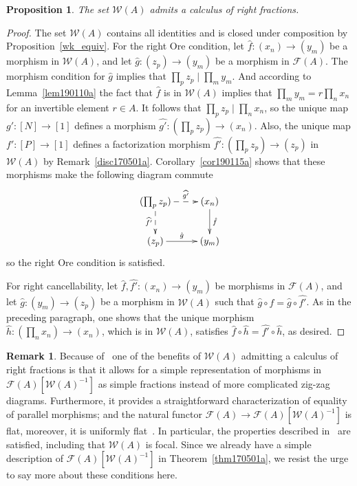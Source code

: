 \documentclass[reqno]{amsart}
\theoremstyle{plain}
\newtheorem{prop}[lem]{Proposition}
\theoremstyle{definition}
\newtheorem{disc}[lem]{Remark}
\newcommand{\cat}[1]{\mathcal{#1}}
\newcommand{\catw}{\cat{W}}
\newcommand{\catf}{\cat{F}}
\numberwithin{equation}{lem}
\begin{document}
\begin{prop} \label{prop190106a}
The set $\catw(A)$ admits a calculus of right fractions.
\end{prop}

\begin{proof}
The set $\catw(A)$ contains all identities and is closed under composition by Proposition~\ref{wk_equiv}.
For the right Ore condition, let $\hat f\colon(x_n)\to(y_m)$ be a morphism in $\catw(A)$, and let
$\hat g\colon(z_p)\to(y_m)$ be a morphism in $\catf(A)$. 
The morphism condition for $\hat g$ implies that $\prod_pz_p\mid\prod_my_m$.
And according to Lemma~\ref{lem190110a}
the fact that $\hat f$ is in $\catw(A)$ implies that $\prod_my_m=r\prod_nx_n$ for an invertible element $r\in A$.
It follows that $\prod_pz_p\mid\prod_nx_n$, so the unique map $g'\colon[N]\to[1]$ defines a morphism $\widehat{g'}\colon(\prod_pz_p)\to(x_n)$.
Also, the unique map $f'\colon [P]\to[1]$ defines a factorization morphism $\widehat{f'}\colon(\prod_pz_p)\to(z_p)$ in $\catw(A)$
by Remark~\ref{disc170501a}.
Corollary~\ref{cor190115a} shows that these morphisms
make the following diagram commute
$$\xymatrix{
(\prod_pz_p) \ar@{-->}[r]^-{\widehat{g'}}\ar@{-->}[d]_{\widehat{f'}}
&(x_n)\ar[d]^{\hat f}\\
(z_p)\ar[r]^-{\hat g}&(y_m)}$$
so the right Ore condition is satisfied.

For right cancellability, let  $\hat f,\widehat{f'}\colon (x_n)\to (y_m)$ be morphisms in $\catf(A)$, and let
$\hat g\colon (y_m)\to (z_p)$ be a morphism in $\catw(A)$ such that $\hat g\circ \hat f=\hat g\circ \widehat{f'}$.
As in the preceding paragraph, one shows that the unique morphism
$\hat h\colon (\prod_nx_n)\to (x_n)$, which is in $\catw(A)$, satisfies $\hat f\circ \hat h=\widehat{f'}\circ\hat h$, as desired.
\end{proof}

\begin{disc}\label{disc190106a}
Because of~\cite[Sections I.2--3]{MR0210125}
one of the benefits of $\catw(A)$ admitting a calculus of right fractions is that it allows for a simple representation of morphisms
in $\catf(A)[\catw(A)^{-1}]$ as simple fractions instead of more complicated zig-zag diagrams. Furthermore, it provides a 
straightforward characterization of equality of parallel morphisms; and the natural functor $\catf(A)\to\catf(A)[\catw(A)^{-1}]$ is flat,
moreover, it is uniformly flat~\cite[Section~6]{MR1406095}.
In particular, the properties described in~\cite[Section~1]{MR1406095} are satisfied, including that $\catw(A)$ is focal.
Since we already have a simple description of $\catf(A)[\catw(A)^{-1}]$ in Theorem~\ref{thm170501a}, we resist the urge to say
more about these conditions here.
\end{disc}
\end{document}
